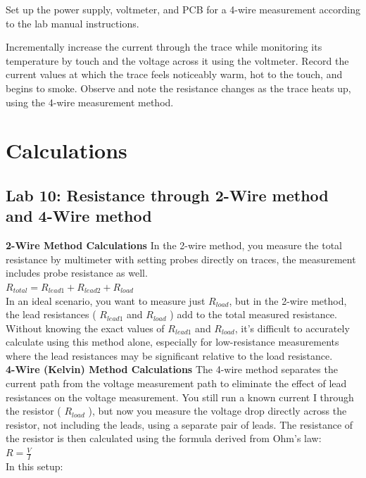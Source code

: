 \documentclass[a4paper,11pt]{article}%
\begin{document}
Set up the power supply, voltmeter, and PCB for a 4-wire measurement according to the lab manual instructions.


Incrementally increase the current through the trace while monitoring its temperature by touch and the voltage across it using the voltmeter.
Record the current values at which the trace feels noticeably warm, hot to the touch, and begins to smoke.
Observe and note the resistance changes as the trace heats up, using the 4-wire measurement method.


\section{Calculations}

\subsection{Lab 10: Resistance through 2-Wire method and 4-Wire method}
\textbf{2-Wire Method Calculations}
In the 2-wire method, you measure the total resistance by multimeter with setting probes directly on traces, the measurement includes probe resistance as well. \\

$R_{total} = R_{lead1} + R_{lead2} + R_{load}$\\
In an ideal scenario, you want to measure just 
$R_{load}$, but in the 2-wire method, the lead resistances (
$R_{lead1}$ and $R_{load}$ ) add to the total measured resistance. Without knowing the exact values of $R_{lead1}$ and $R_{load}$, it's difficult to accurately calculate using this method alone, especially for low-resistance measurements where the lead resistances may be significant relative to the load resistance.\\

\textbf{4-Wire (Kelvin) Method Calculations}
The 4-wire method separates the current path from the voltage measurement path to eliminate the effect of lead resistances on the voltage measurement. You still run a known current I through the resistor ( $R_{load}$ ), but now you measure the voltage drop directly across the resistor, not including the leads, using a separate pair of leads.
The resistance of the resistor is then calculated using the formula derived from Ohm's law:\\

$R = \frac{V}{I}$\\


In this setup:\\
\end{document}
